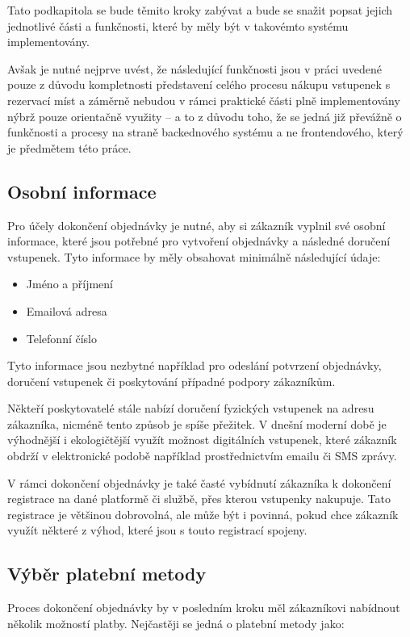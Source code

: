 Tato podkapitola se bude těmito kroky zabývat a bude se snažit popsat jejich jednotlivé části a funkčnosti, které by měly být v takovémto systému implementovány.

Avšak je nutné nejprve uvést, že následující funkčnosti jsou v práci uvedené pouze z důvodu kompletnosti představení celého procesu nákupu vstupenek s rezervací míst a záměrně nebudou v rámci praktické části plně implementovány nýbrž pouze orientačně využity – a to z důvodu toho, že se jedná již převážně o funkčnosti a procesy na straně backednového systému a ne frontendového, který je předmětem této práce.

\subsection{Osobní informace}
\label{sec:specifikace-dokonceni-objednavky-osobni-informace}
Pro účely dokončení objednávky je nutné, aby si zákazník vyplnil své osobní informace, které jsou potřebné pro vytvoření objednávky a následné doručení vstupenek. Tyto informace by měly obsahovat minimálně následující údaje:

\begin{itemize}
    \item Jméno a příjmení
    \item Emailová adresa
    \item Telefonní číslo
\end{itemize}

Tyto informace jsou nezbytné například pro odeslání potvrzení objednávky, doručení vstupenek či poskytování případné podpory zákazníkům.

Někteří poskytovatelé stále nabízí doručení fyzických vstupenek na adresu zákazníka, nicméně tento způsob je spíše přežitek. V dnešní moderní době je výhodnější i ekologičtější využít možnost digitálních vstupenek, které zákazník obdrží v elektronické podobě například prostřednictvím emailu či SMS zprávy.

V rámci dokončení objednávky je také časté vybídnutí zákazníka k dokončení registrace na dané platformě či službě, přes kterou vstupenky nakupuje. Tato registrace je většinou dobrovolná, ale může být i povinná, pokud chce zákazník využít některé z výhod, které jsou s touto registrací spojeny.

\subsection{Výběr platební metody}
\label{sec:specifikace-dokonceni-objednavky-vyber-platebni-metody}
Proces dokončení objednávky by v posledním kroku měl zákazníkovi nabídnout několik možností platby. Nejčastěji se jedná o platební metody jako:

